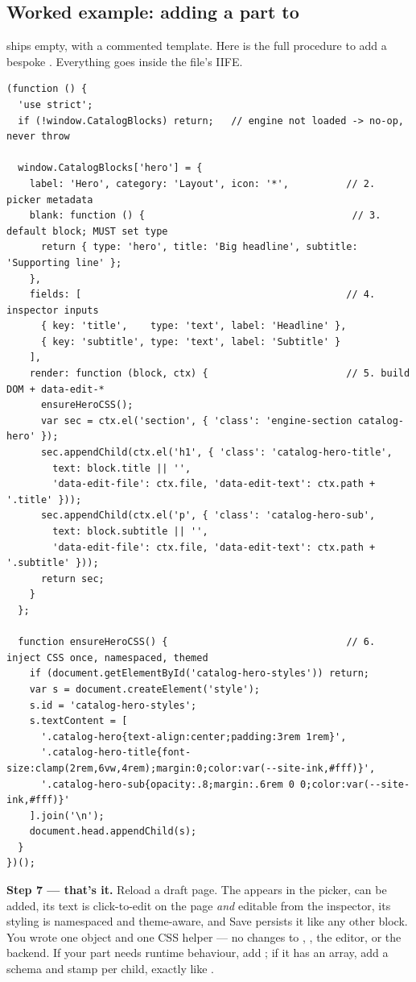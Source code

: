 \documentclass[11pt]{article}
\begin{document}
\subsection{Worked example: adding a part to }

 ships empty, with a commented template. Here is the full
procedure to add a bespoke . Everything goes inside the file's IIFE.

\begin{lstlisting}
(function () {
  'use strict';
  if (!window.CatalogBlocks) return;   // engine not loaded -> no-op, never throw

  window.CatalogBlocks['hero'] = {
    label: 'Hero', category: 'Layout', icon: '*',          // 2. picker metadata
    blank: function () {                                    // 3. default block; MUST set type
      return { type: 'hero', title: 'Big headline', subtitle: 'Supporting line' };
    },
    fields: [                                              // 4. inspector inputs
      { key: 'title',    type: 'text', label: 'Headline' },
      { key: 'subtitle', type: 'text', label: 'Subtitle' }
    ],
    render: function (block, ctx) {                        // 5. build DOM + data-edit-*
      ensureHeroCSS();
      var sec = ctx.el('section', { 'class': 'engine-section catalog-hero' });
      sec.appendChild(ctx.el('h1', { 'class': 'catalog-hero-title',
        text: block.title || '',
        'data-edit-file': ctx.file, 'data-edit-text': ctx.path + '.title' }));
      sec.appendChild(ctx.el('p', { 'class': 'catalog-hero-sub',
        text: block.subtitle || '',
        'data-edit-file': ctx.file, 'data-edit-text': ctx.path + '.subtitle' }));
      return sec;
    }
  };

  function ensureHeroCSS() {                               // 6. inject CSS once, namespaced, themed
    if (document.getElementById('catalog-hero-styles')) return;
    var s = document.createElement('style');
    s.id = 'catalog-hero-styles';
    s.textContent = [
      '.catalog-hero{text-align:center;padding:3rem 1rem}',
      '.catalog-hero-title{font-size:clamp(2rem,6vw,4rem);margin:0;color:var(--site-ink,#fff)}',
      '.catalog-hero-sub{opacity:.8;margin:.6rem 0 0;color:var(--site-ink,#fff)}'
    ].join('\n');
    document.head.appendChild(s);
  }
})();
\end{lstlisting}

\textbf{Step 7 --- that's it.} Reload a draft page. The  appears in the
picker, can be added, its text is click-to-edit on the page \emph{and} editable
from the inspector, its styling is namespaced and theme-aware, and Save persists
it like any other block. You wrote one object and one CSS helper --- no changes
to , , the editor, or the backend. If your part
needs runtime behaviour, add ; if it has an array, add a
 schema and stamp  per child, exactly like
.
\end{document}

